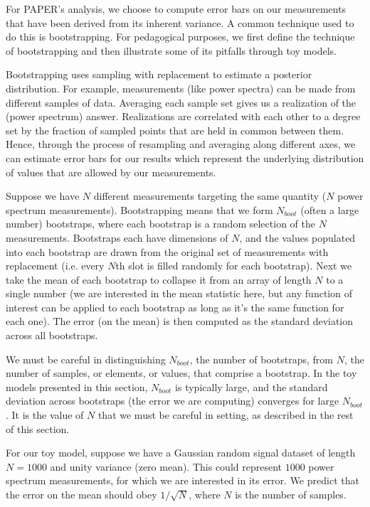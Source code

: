 \documentclass[preprint2,numberedappendix,tighten]{aastex6}  %
\begin{document}
For PAPER's analysis, we choose to compute error bars on our measurements that have been derived from its inherent 
variance. A common technique used to do this is bootstrapping. For pedagogical purposes, we first define the technique of 
bootstrapping and then illustrate some of its pitfalls through toy models.

Bootstrapping uses sampling with replacement to estimate a posterior distribution. For example, measurements (like power 
spectra) can be made from different samples of data. Averaging each sample set gives us a realization of the (power spectrum) 
answer. Realizations are correlated with each other to a degree set by the fraction of sampled points that are held in common 
between them. Hence, through the process of resampling and averaging along different axes, we can estimate error bars for 
our results which represent the underlying distribution of values that are allowed by our measurements.

Suppose we have $N$ different measurements targeting the same quantity ($N$ power spectrum measurements). 
Bootstrapping means that we form $N_{boot}$ (often a large number) bootstraps, where each bootstrap is a random selection 
of the $N$ measurements. Bootstraps each have dimensions of $N$, and the values populated into each bootstrap are drawn 
from the original set of measurements with replacement (i.e. every $N$th slot is filled randomly for each bootstrap). Next we take 
the mean of each bootstrap to collapse it from an array of length $N$ to a single number (we are interested in the mean statistic 
here, but any function of interest can be applied to each bootstrap as long as it's the same function for each one). The error (on 
the mean) is then computed as the standard deviation across all bootstraps. 

We must be careful in distinguishing $N_{boot}$, the number of bootstraps, from $N$, the number of samples, or elements, or 
values, that comprise a bootstrap. In the toy models presented in this section, $N_{boot}$ is typically large, and the standard 
deviation across bootstraps (the error we are computing) converges for large $N_{boot}$. It is the value of $N$ that we must be 
careful in setting, as described in the rest of this section.

For our toy model, suppose we have a Gaussian random signal dataset of length $N=1000$ and unity variance (zero mean). 
This could represent $1000$ power spectrum measurements, for which we are interested in its error. We predict that the error 
on the mean should obey $1/\sqrt{N}$, where $N$ is the number of samples.
\end{document}
